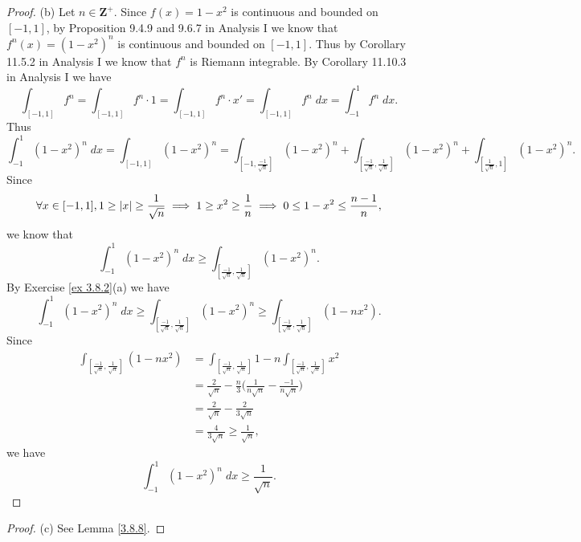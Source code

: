 \begin{proof}{(b)}
    Let \(n \in \mathbf{Z}^+\).
    Since \(f(x) = 1 - x^2\) is continuous and bounded on \([-1, 1]\), by Proposition 9.4.9 and 9.6.7 in Analysis I we know that \(f^n(x) = (1 - x^2)^n\) is continuous and bounded on \([-1, 1]\).
    Thus by Corollary 11.5.2 in Analysis I we know that \(f^n\) is Riemann integrable.
    By Corollary 11.10.3 in Analysis I we have
    \[
        \int_{[-1, 1]} f^n = \int_{[-1, 1]} f^n \cdot 1 = \int_{[-1, 1]} f^n \cdot x' = \int_{[-1, 1]} f^n \; dx = \int_{-1}^1 f^n \; dx.
    \]
    Thus
    \[
        \int_{-1}^1 (1 - x^2)^n \; dx = \int_{[-1, 1]} (1 - x^2)^n = \int_{[-1, \frac{-1}{\sqrt{n}}]} (1 - x^2)^n + \int_{[\frac{-1}{\sqrt{n}}, \frac{1}{\sqrt{n}}]} (1 - x^2)^n + \int_{[\frac{1}{\sqrt{n}}, 1]} (1 - x^2)^n.
    \]
    Since
    \[
        \forall x \in [-1, 1], 1 \geq \abs*{x} \geq \frac{1}{\sqrt{n}} \implies 1 \geq x^2 \geq \frac{1}{n} \implies 0 \leq 1 - x^2 \leq \frac{n - 1}{n},
    \]
    we know that
    \[
        \int_{-1}^1 (1 - x^2)^n \; dx \geq \int_{[\frac{-1}{\sqrt{n}}, \frac{1}{\sqrt{n}}]} (1 - x^2)^n.
    \]
    By Exercise \ref{ex 3.8.2}(a) we have
    \[
        \int_{-1}^1 (1 - x^2)^n \; dx \geq \int_{[\frac{-1}{\sqrt{n}}, \frac{1}{\sqrt{n}}]} (1 - x^2)^n \geq \int_{[\frac{-1}{\sqrt{n}}, \frac{1}{\sqrt{n}}]} (1 - n x^2).
    \]
    Since
    \begin{align*}
        \int_{[\frac{-1}{\sqrt{n}}, \frac{1}{\sqrt{n}}]} (1 - n x^2) & = \int_{[\frac{-1}{\sqrt{n}}, \frac{1}{\sqrt{n}}]} 1 - n \int_{[\frac{-1}{\sqrt{n}}, \frac{1}{\sqrt{n}}]} x^2 \\
                                                                     & = \frac{2}{\sqrt{n}} - \frac{n}{3} \bigg(\frac{1}{n \sqrt{n}} - \frac{-1}{n \sqrt{n}}\bigg)                   \\
                                                                     & = \frac{2}{\sqrt{n}} - \frac{2}{3 \sqrt{n}}                                                                   \\
                                                                     & = \frac{4}{3 \sqrt{n}} \geq \frac{1}{\sqrt{n}},
    \end{align*}
    we have
    \[
        \int_{-1}^1 (1 - x^2)^n \; dx \geq \frac{1}{\sqrt{n}}.
    \]
\end{proof}

\begin{proof}{(c)}
    See Lemma \ref{3.8.8}.
\end{proof}

